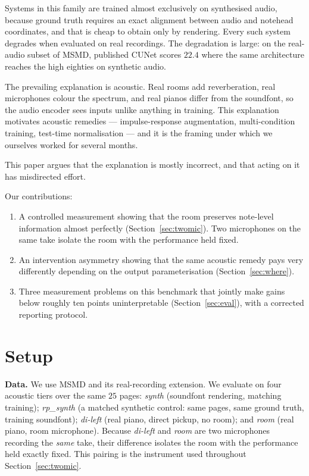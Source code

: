 \documentclass{article}
\begin{document}
Systems in this family are trained almost exclusively on synthesised audio,
because ground truth requires an exact alignment between audio and notehead
coordinates, and that is cheap to obtain only by rendering. Every such system
degrades when evaluated on real recordings. The degradation is large: on the
real-audio subset of MSMD, published CUNet scores $22.4$ where the same
architecture reaches the high eighties on synthetic audio.

The prevailing explanation is acoustic. Real rooms add reverberation, real
microphones colour the spectrum, and real pianos differ from the soundfont, so
the audio encoder sees inputs unlike anything in training. This explanation
motivates acoustic remedies --- impulse-response augmentation, multi-condition
training, test-time normalisation --- and it is the framing under which we
ourselves worked for several months.

This paper argues that the explanation is mostly incorrect, and that acting on
it has misdirected effort.

Our contributions:
\begin{enumerate}
\itemsep0em
\item A controlled measurement showing that the room preserves note-level
      information almost perfectly (Section~\ref{sec:twomic}). Two microphones
      on the same take isolate the room with the performance held fixed.
\item An intervention asymmetry showing that the same acoustic remedy pays very
      differently depending on the output parameterisation
      (Section~\ref{sec:where}).
\item Three measurement problems on this benchmark that jointly make gains
      below roughly ten points uninterpretable (Section~\ref{sec:eval}), with
      a corrected reporting protocol.
\end{enumerate}

\section{Setup}
\label{sec:setup}

\noindent\textbf{Data.} We use MSMD and its real-recording extension. We
evaluate on four acoustic tiers over the same $25$ pages:
\emph{synth} (soundfont rendering, matching training);
\emph{rp\_synth} (a matched synthetic control: same pages, same ground truth,
training soundfont);
\emph{di-left} (real piano, direct pickup, no room);
and \emph{room} (real piano, room microphone). Because \emph{di-left} and
\emph{room} are two microphones recording the \emph{same} take, their
difference isolates the room with the performance held exactly fixed. This
pairing is the instrument used throughout Section~\ref{sec:twomic}.
\end{document}
